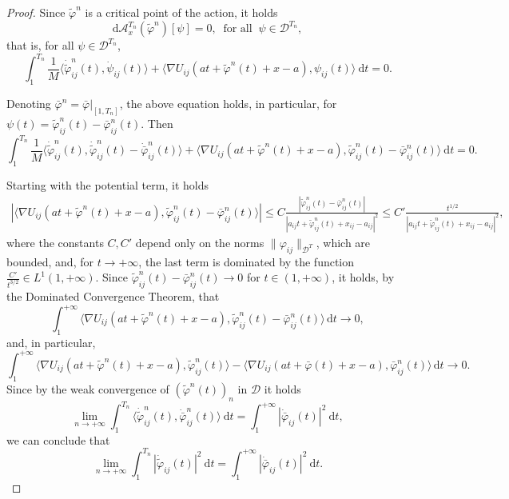 \documentclass[a4paper,10pt]{amsart}
\newcommand{\ud}{\mathrm{d}}
\theoremstyle{plain}
\theoremstyle{definition}
\numberwithin{equation}{section}
\numberwithin{thm}{section}
\begin{document}
\begin{proof}
Since $\tilde\varphi^n$ is a critical point of the action, it holds
\[
\ud \mathcal{A}_{x}^{T_n}(\tilde\varphi^n)[\psi] = 0, \ \mbox{ for all } \ \psi\in\mathcal{D}^{T_n},
\]
that is, for all $\psi\in\mathcal{D}^{T_n}$,
\[
\int_{1}^{T_n} \frac1M\langle\dot{\tilde\varphi}_{ij}^n(t),\dot\psi_{ij}(t)\rangle + \langle\nabla U_{ij}(at+\tilde\varphi^n(t)+x-a),\psi_{ij}(t)\rangle\ \ud t = 0.
\]

Denoting $\bar\varphi^n = \bar\varphi\big|_{[1,T_n]}$, the above equation holds, in particular, for $\psi(t)=\tilde\varphi_{ij}^n(t)-\bar\varphi_{ij}^n(t)$. Then
\[
\int_{1}^{T_n}\frac1M\langle\dot{\tilde\varphi}_{ij}^n(t),\dot{\tilde\varphi}_{ij}^n(t)-\dot{\bar\varphi}_{ij}^n(t)\rangle + \langle\nabla U_{ij}(at+\tilde\varphi^n(t)+x-a),\tilde\varphi_{ij}^n(t)-\bar\varphi_{ij}^n(t)\rangle\ \ud t = 0.
\]

Starting with the potential term, it holds
\[
\begin{split}
\left|\langle\nabla U_{ij}(at+\tilde\varphi^n(t)+x-a),\tilde\varphi_{ij}^n(t)-\bar\varphi_{ij}^n(t)\rangle \right| \leq C\frac{|\tilde\varphi_{ij}^n(t) - \bar\varphi_{ij}^n(t)|}{|a_{ij}t + \tilde\varphi^n_{ij}(t)+x_{ij}-a_{ij}|^2} \leq C'\frac{t^{1/2}}{|a_{ij}t + \tilde\varphi^n_{ij}(t)+x_{ij}-a_{ij}|^2},
\end{split}
\]
where the constants $C,C'$ depend only on the norms $\|\varphi_{ij}\|_{\mathcal{D}^T}$, which are bounded, and, for $t\rightarrow+\infty$, the last term is dominated by the function $\frac{C'}{t^{3/2}}\in L^1(1,+\infty)$. Since $\tilde\varphi_{ij}^n(t)-\bar\varphi_{ij}^n(t)\rightarrow0$ for $t \in (1,+\infty)$, it holds, by the Dominated Convergence Theorem, that
\begin{equation*} 
\int_1^{+\infty} \langle\nabla U_{ij}(at+\tilde\varphi^n(t)+x-a),\tilde\varphi_{ij}^n(t)-\bar\varphi_{ij}^n(t)\rangle\, \ud t\rightarrow 0,
\end{equation*}
and, in particular,
\begin{equation} 
\label{eq:conv_pot}
\int_1^{+\infty} \langle\nabla U_{ij}(at+\tilde\varphi^n(t)+x-a),\tilde\varphi_{ij}^n(t)\rangle - \langle\nabla U_{ij}(at+\bar\varphi(t)+x-a),\bar\varphi_{ij}^n(t)\rangle \, \ud t\rightarrow 0.
\end{equation}
Since by the weak convergence of $(\tilde\varphi^n(t))_n$ in $\mathcal{D}$ it holds
\[
\lim_{n\rightarrow+\infty}\int_{1}^{T_n} \langle\dot{\tilde\varphi}_{ij}^n(t),\dot{\bar\varphi}_{ij}^n(t)\rangle\ \ud t = \int_{1}^{+\infty} |\dot{\bar\varphi}_{ij}(t)|^2\ \ud t, 
\]
we can conclude that 
\begin{equation} 
\label{eq:conv_norm}
\lim_{n\rightarrow+\infty} \int_{1}^{T_n} |\dot{\tilde\varphi}_{ij}(t)|^2\ \ud t = \int_{1}^{+\infty} |\dot{\bar\varphi}_{ij}(t)|^2\ \ud t.
\end{equation}


\end{proof}
\end{document}
